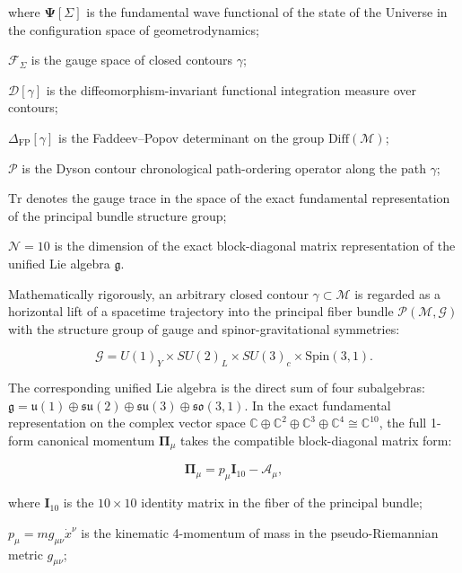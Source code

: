 \documentclass[11pt,a4paper]{article}
\theoremstyle{definition}
\begin{document}
where $\mathbf{\Psi}[\Sigma]$ is the fundamental wave functional of the state of the Universe in the configuration space of geometrodynamics;  

$\mathcal{F}_\Sigma$ is the gauge space of closed contours $\gamma$;  

$\mathcal{D}[\gamma]$ is the diffeomorphism-invariant functional integration measure over contours;  

$\Delta_{\text{FP}}[\gamma]$ is the Faddeev--Popov determinant on the group $\text{Diff}(\mathcal{M})$;  

$\mathcal{P}$ is the Dyson contour chronological path-ordering operator along the path $\gamma$;  

$\text{Tr}$ denotes the gauge trace in the space of the exact fundamental representation of the principal bundle structure group;  

$\mathcal{N} = 10$ is the dimension of the exact block-diagonal matrix representation of the unified Lie algebra $\mathfrak{g}$.

Mathematically rigorously, an arbitrary closed contour $\gamma \subset \mathcal{M}$ is regarded as a horizontal lift of a spacetime trajectory into the principal fiber bundle $\mathcal{P}(\mathcal{M}, \mathcal{G})$ with the structure group of gauge and spinor-gravitational symmetries:

\begin{equation*}
\mathcal{G} = U(1)_Y \times SU(2)_L \times SU(3)_c \times \text{Spin}(3,1).
\end{equation*}

The corresponding unified Lie algebra is the direct sum of four subalgebras: $\mathfrak{g} = \mathfrak{u}(1) \oplus \mathfrak{su}(2) \oplus \mathfrak{su}(3) \oplus \mathfrak{so}(3,1)$. In the exact fundamental representation on the complex vector space $\mathbb{C} \oplus \mathbb{C}^2 \oplus \mathbb{C}^3 \oplus \mathbb{C}^4 \cong \mathbb{C}^{10}$, the full 1-form canonical momentum $\mathbf{\Pi}_\mu$ takes the compatible block-diagonal matrix form:

\begin{equation}\label{eq:1.27}\tag{1.27}
\mathbf{\Pi}_\mu = p_\mu \mathbf{I}_{10} - \mathbf{\mathcal{A}}_\mu,
\end{equation}

where $\mathbf{I}_{10}$ is the $10 \times 10$ identity matrix in the fiber of the principal bundle;  

$p_\mu = m g_{\mu\nu} \dot{x}^\nu$ is the kinematic 4-momentum of mass in the pseudo-Riemannian metric $g_{\mu\nu}$;  
\end{document}
